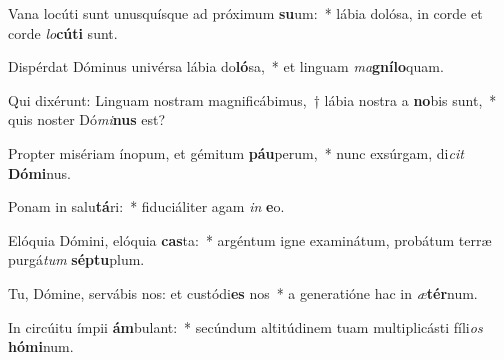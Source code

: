 \item Vana locúti sunt unusquísque ad próximum \textbf{su}um:~* lábia dolósa, in corde et corde \textit{lo}\textbf{cú}\textbf{ti} sunt.
\item Dispérdat Dóminus univérsa lábia do\textbf{ló}sa,~* et linguam \textit{ma}\textbf{gní}\textbf{lo}quam.
\item Qui dixérunt: Linguam nostram magnificábimus,~† lábia nostra a \textbf{no}bis sunt,~* quis noster Dó\textit{mi}\textbf{nus} est?
\item Propter misériam ínopum, et gémitum \textbf{páu}perum,~* nunc exsúrgam, di\textit{cit} \textbf{Dó}\textbf{mi}nus.
\item Ponam in salu\textbf{tá}ri:~* fiduciáliter agam \textit{in} \textbf{e}o.
\item Elóquia Dómini, elóquia \textbf{cas}ta:~* argéntum igne examinátum, probátum terræ purgá\textit{tum} \textbf{sép}\textbf{tu}plum.
\item Tu, Dómine, servábis nos: et custódi\textbf{es} nos~* a generatióne hac in \textit{æ}\textbf{tér}num.
\item In circúitu ímpii \textbf{ám}bulant:~* secúndum altitúdinem tuam multiplicásti fíli\textit{os} \textbf{hó}\textbf{mi}num.
